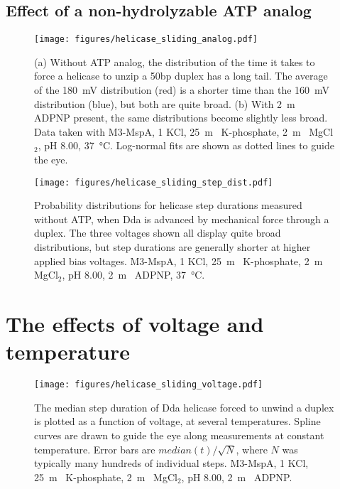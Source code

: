 \subsection{Effect of a non-hydrolyzable ATP analog}

\begin{figure}[h]
\begin{centering}
\texttt{[image: figures/helicase\_sliding\_analog.pdf]}
\caption[Forced unzipping time depends on the presence of an ATP analog]{(a) Without ATP analog, the distribution of the time it takes to force a helicase to unzip a \num{50}bp duplex has a long tail.  The average of the \SI{180}{\mV} distribution (red) is a shorter time than the \SI{160}{\mV} distribution (blue), but both are quite broad.  (b) With \SI{2}{\m\Molar} ADPNP present, the same distributions become slightly less broad.  Data taken with M3-MspA, \SI{1}{\Molar} KCl, \SI{25}{\m\Molar} K-phosphate, \SI{2}{\m\Molar} MgCl$_2$, pH \num{8.00}, \SI{37}{\celsius}.  Log-normal fits are shown as dotted lines to guide the eye.}
\label{fig:helicase_sliding_analog}
\end{centering}
\end{figure}

\begin{figure}[h]
\begin{centering}
\texttt{[image: figures/helicase\_sliding\_step\_dist.pdf]}
\caption[Distribution of step durations using mechanical force]{Probability distributions for helicase step durations measured without ATP, when Dda is advanced by mechanical force through a duplex.  The three voltages shown all display quite broad distributions, but step durations are generally shorter at higher applied bias voltages.  M3-MspA, \SI{1}{\Molar} KCl, \SI{25}{\m\Molar} K-phosphate, \SI{2}{\m\Molar} MgCl$_2$, pH \num{8.00}, \SI{2}{\m\Molar} ADPNP, \SI{37}{\celsius}.}
\label{fig:helicase_sliding_time_dist}
\end{centering}
\end{figure}

\section{The effects of voltage and temperature}

\begin{figure}[h]
\begin{centering}
\texttt{[image: figures/helicase\_sliding\_voltage.pdf]}
\caption[Forced helicase stepping depends on voltage]{The median step duration of Dda helicase forced to unwind a duplex is plotted as a function of voltage, at several temperatures.  Spline curves are drawn to guide the eye along measurements at constant temperature.  Error bars are $median(t)/\sqrt{N}$, where $N$ was typically many hundreds of individual steps.  M3-MspA, \SI{1}{\Molar} KCl, \SI{25}{\m\Molar} K-phosphate, \SI{2}{\m\Molar} MgCl$_2$, pH \num{8.00}, \SI{2}{\m\Molar} ADPNP.}
\label{fig:helicase_stepping_voltage}
\end{centering}
\end{figure}

